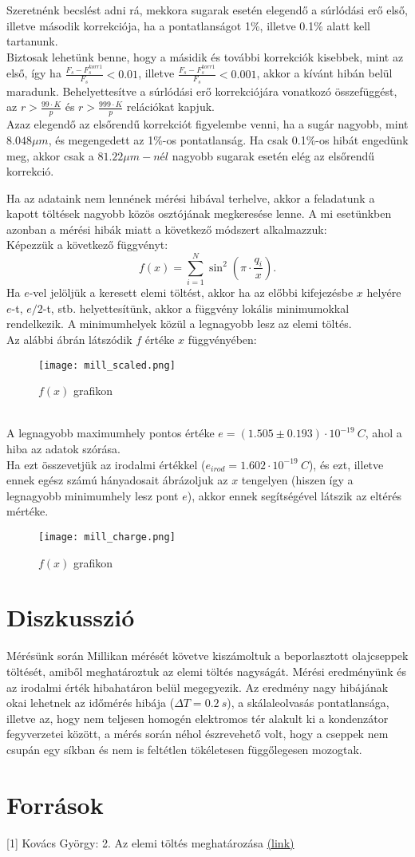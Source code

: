 \documentclass[a4paper]{article}
\begin{document}
Szeretnénk becslést adni rá, mekkora sugarak esetén elegendő a súrlódási erő első, illetve második korrekciója, ha a pontatlanságot 1\%, illetve 0.1\% alatt kell tartanunk.  \\
Biztosak lehetünk benne, hogy a másidik és további korrekciók kisebbek, mint az első, így ha $\frac{F_s-F^{korr1}_s}{F_s}<0.01$, illetve $\frac{F_s-F^{korr1}_s}{F_s}<0.001$, akkor a kívánt hibán belül maradunk. Behelyettesítve a súrlódási erő korrekciójára vonatkozó összefüggést, az $r>\frac{99 \cdot K}{p}$ és  $r>\frac{999 \cdot K}{p}$  relációkat kapjuk. \\
Azaz elegendő az elsőrendű korrekciót figyelembe venni, ha a sugár nagyobb, mint $8.048 \mu m$, és megengedett az 1\%-os pontatlanság. Ha csak 0.1\%-os hibát engedünk meg, akkor csak a $81.22 \mu m-nél$ nagyobb sugarak esetén elég az elsőrendű korrekció.

Ha az adataink nem lennének mérési hibával terhelve, akkor a feladatunk a kapott töltések nagyobb közös osztójának megkeresése lenne. A mi esetünkben azonban a mérési hibák miatt a következő módszert alkalmazzuk:\\
Képezzük a következő függvényt:
\begin{equation}
f(x)=\sum_{i=1}^N \sin^2\left(\pi\cdot\frac{q_i}{x}\right).
\end{equation}
Ha $e$-vel jelöljük a keresett elemi töltést, akkor ha az előbbi kifejezésbe $x$ helyére $e$-t, $e/2$-t, stb. helyettesítünk, akkor a függvény lokális minimumokkal rendelkezik. A minimumhelyek közül a legnagyobb lesz az elemi töltés.\\
Az alábbi ábrán látszódik $f$ értéke $x$ függvényében:
\begin{figure}[h!]\centering
	\caption{$f(x)$ grafikon}
	\texttt{[image: mill\_scaled.png]}
\end{figure}\\
A legnagyobb maximumhely pontos értéke $e=(1.505\pm0.193)\cdot 10^{-19}\ C$, ahol a hiba az adatok szórása.\\
Ha ezt összevetjük az irodalmi értékkel ($e_{irod}=1.602\cdot 10^{-19}\ C$), és ezt, illetve ennek egész számú hányadosait ábrázoljuk az $x$ tengelyen (hiszen így a legnagyobb minimumhely lesz pont $e$), akkor ennek segítségével látszik az eltérés mértéke.
\begin{figure}[h!]\centering
	\caption{$f(x)$ grafikon}
	\texttt{[image: mill\_charge.png]}
\end{figure}

\section{Diszkusszió}
Mérésünk során Millikan mérését követve kiszámoltuk a beporlasztott olajcseppek töltését, amiből meghatároztuk az elemi töltés nagyságát. Mérési eredményünk és az irodalmi érték hibahatáron belül megegyezik. Az eredmény nagy hibájának okai lehetnek az időmérés hibája ($\Delta T=0.2\ s$), a skálaleolvasás pontatlansága, illetve az, hogy nem teljesen homogén elektromos tér alakult ki a kondenzátor fegyverzetei között, a mérés során néhol észrevehető volt, hogy a cseppek nem csupán egy síkban és nem is feltétlen tökéletesen függőlegesen mozogtak.

\section{Források}
[1] Kovács György: 2. Az elemi töltés meghatározása
\href{http://wigner.elte.hu/koltai/labor/parts/modern2.pdf}{(link)}
\end{document}
